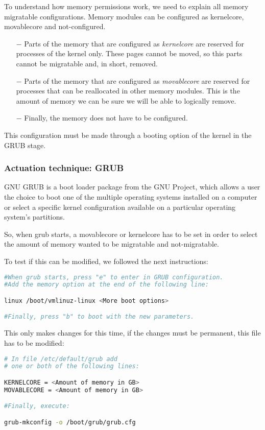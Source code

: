 To understand how memory permissions work, we need to explain all memory migratable configurations. Memory modules can be configured as kernelcore, movablecore and not-configured.

\begin{itemize}
    \item[$-$] Parts of the memory that are configured as \emph{kernelcore} are reserved for processes of the kernel only. These pages cannot be moved, so this parts cannot be migratable and, in short, removed.
    \item[$-$] Parts of the memory that are configured as \emph{movablecore} are reserved for processes that can be reallocated in other memory modules. This is the amount of memory we can be sure we will be able to logically remove.
    \item[$-$] Finally, the memory does not have to be configured.
\end{itemize}

This configuration must be made through a booting option of the kernel in the GRUB stage.
\subsubsection{Actuation technique: GRUB}

GNU GRUB is a boot loader package from the GNU Project, which allows a user the choice to boot one of the multiple operating systems installed on a computer or select a specific kernel configuration available on a particular operating system's partitions.

So, when grub starts, a movablecore or kernelcore has to be set in order to select the amount of memory wanted to be migratable and not-migratable.

To test if this can be modified, we followed the next instructions:

\begin{lstlisting}[language=Bash]
#When grub starts, press "e" to enter in GRUB configuration.
#Add the memory option at the end of the following line:

linux /boot/vmlinuz-linux <More boot options>

#Finally, press "b" to boot with the new parameters.
\end{lstlisting}

This only makes changes for this time, if the changes must be permanent, this file has to be modified:

\begin{lstlisting}[language=Bash]
# In file /etc/default/grub add
# one or both of the following lines:

KERNELCORE = <Amount of memory in GB>
MOVABLECORE = <Amount of memory in GB>

#Finally, execute:

grub-mkconfig -o /boot/grub/grub.cfg

\end{lstlisting}




